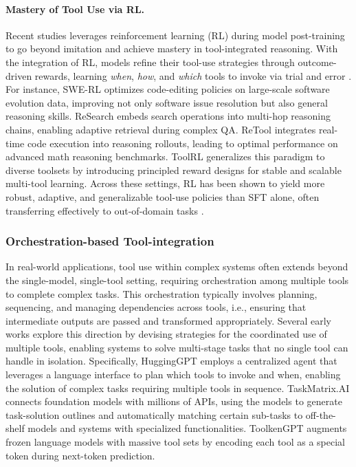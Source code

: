 \paragraph{Mastery of Tool Use via RL.} \space Recent studies \citep{zhou2025sweet, qian2025toolrl, wei2025swe, chen2025learning, zhang2025rlvmr, jin2025search, zou2025autotool, dong2025reinforcement} leverages reinforcement learning (RL) during model post-training to go beyond imitation and achieve mastery in tool-integrated reasoning. With the integration of RL, models refine their tool-use strategies through outcome-driven rewards, learning \textit{when}, \textit{how}, and \textit{which} tools to invoke via trial and error \cite{chen2025learning, feng2025retool, dong2025reinforcement, sun2025zerosearch}. For instance, SWE-RL \citep{wei2025swe} optimizes code-editing policies on large-scale software evolution data, improving not only software issue resolution but also general reasoning skills. ReSearch \cite{chen2025learning} embeds search operations into multi-hop reasoning chains, enabling adaptive retrieval during complex QA. ReTool integrates real-time code execution into reasoning rollouts, leading to optimal performance on advanced math reasoning benchmarks. ToolRL \cite{qian2025toolrl} generalizes this paradigm to diverse toolsets by introducing principled reward designs for stable and scalable multi-tool learning. Across these settings, RL has been shown to yield more robust, adaptive, and generalizable tool-use policies than SFT alone, often transferring effectively to out-of-domain tasks \cite{team2025kimi1.5, comanici2025gemini, team2025kimi2, zeng2025glm, zou2025tattoo}.



\subsubsection{Orchestration-based Tool-integration} In real-world applications, tool use within complex systems often extends beyond the single-model, single-tool setting, requiring orchestration among multiple tools to complete complex tasks. This orchestration typically involves planning, sequencing, and managing dependencies across tools, i.e., ensuring that intermediate outputs are passed and transformed appropriately. Several early works \citep{shen2023hugginggpt, DBLP:journals/corr/abs-2303-16434, DBLP:conf/nips/HaoLWH23} explore this direction by devising strategies for the coordinated use of multiple tools, enabling systems to solve multi-stage tasks that no single tool can handle in isolation. Specifically, HuggingGPT \citep{shen2023hugginggpt} employs a centralized agent that leverages a language interface to plan which tools to invoke and when, enabling the solution of complex tasks requiring multiple tools in sequence. TaskMatrix.AI \citep{DBLP:journals/corr/abs-2303-16434} connects foundation models with millions of APIs, using the models to generate task-solution outlines and automatically matching certain sub-tasks to off-the-shelf models and systems with specialized functionalities. ToolkenGPT \citep{lu2025octotoolsagenticframeworkextensible} augments frozen language models with massive tool sets by encoding each tool as a special token during next-token prediction.

